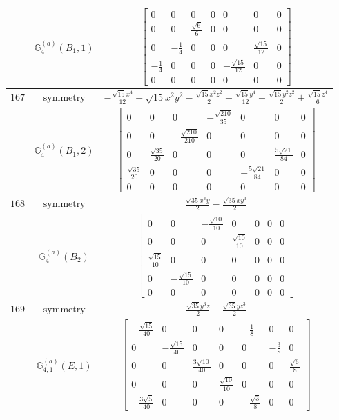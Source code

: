 \documentclass[fleqn,8pt,landscape]{jsarticle}
\begin{document}
\begin{longtable}{ccc}
$  $ & $ \mathbb{G}_{4}^{(a)}(B_{1},1) $ & $ \begin{bmatrix} 0 & 0 & 0 & 0 & 0 & 0 & 0 \\ 0 & 0 & \frac{\sqrt{6}}{6} & 0 & 0 & 0 & 0 \\ 0 & - \frac{1}{4} & 0 & 0 & 0 & \frac{\sqrt{15}}{12} & 0 \\ - \frac{1}{4} & 0 & 0 & 0 & - \frac{\sqrt{15}}{12} & 0 & 0 \\ 0 & 0 & 0 & 0 & 0 & 0 & 0 \end{bmatrix} $ \\ \hline
$ 167 $ & $ \text{symmetry} $ & $ - \frac{\sqrt{15} x^{4}}{12} + \sqrt{15} x^{2} y^{2} - \frac{\sqrt{15} x^{2} z^{2}}{2} - \frac{\sqrt{15} y^{4}}{12} - \frac{\sqrt{15} y^{2} z^{2}}{2} + \frac{\sqrt{15} z^{4}}{6} $ \\
$  $ & $ \mathbb{G}_{4}^{(a)}(B_{1},2) $ & $ \begin{bmatrix} 0 & 0 & 0 & - \frac{\sqrt{210}}{35} & 0 & 0 & 0 \\ 0 & 0 & - \frac{\sqrt{210}}{210} & 0 & 0 & 0 & 0 \\ 0 & \frac{\sqrt{35}}{20} & 0 & 0 & 0 & \frac{5 \sqrt{21}}{84} & 0 \\ \frac{\sqrt{35}}{20} & 0 & 0 & 0 & - \frac{5 \sqrt{21}}{84} & 0 & 0 \\ 0 & 0 & 0 & 0 & 0 & 0 & 0 \end{bmatrix} $ \\ \hline
$ 168 $ & $ \text{symmetry} $ & $ \frac{\sqrt{35} x^{3} y}{2} - \frac{\sqrt{35} x y^{3}}{2} $ \\
$  $ & $ \mathbb{G}_{4}^{(a)}(B_{2}) $ & $ \begin{bmatrix} 0 & 0 & - \frac{\sqrt{10}}{10} & 0 & 0 & 0 & 0 \\ 0 & 0 & 0 & \frac{\sqrt{10}}{10} & 0 & 0 & 0 \\ \frac{\sqrt{15}}{10} & 0 & 0 & 0 & 0 & 0 & 0 \\ 0 & - \frac{\sqrt{15}}{10} & 0 & 0 & 0 & 0 & 0 \\ 0 & 0 & 0 & 0 & 0 & 0 & 0 \end{bmatrix} $ \\ \hline
$ 169 $ & $ \text{symmetry} $ & $ \frac{\sqrt{35} y^{3} z}{2} - \frac{\sqrt{35} y z^{3}}{2} $ \\
$  $ & $ \mathbb{G}_{4,1}^{(a)}(E,1) $ & $ \begin{bmatrix} - \frac{\sqrt{15}}{40} & 0 & 0 & 0 & - \frac{1}{8} & 0 & 0 \\ 0 & - \frac{\sqrt{15}}{40} & 0 & 0 & 0 & - \frac{3}{8} & 0 \\ 0 & 0 & \frac{3 \sqrt{10}}{40} & 0 & 0 & 0 & \frac{\sqrt{6}}{8} \\ 0 & 0 & 0 & \frac{\sqrt{10}}{10} & 0 & 0 & 0 \\ - \frac{3 \sqrt{5}}{40} & 0 & 0 & 0 & - \frac{\sqrt{3}}{8} & 0 & 0 \end{bmatrix} $ \\ \hline

\end{longtable}
\end{document}
